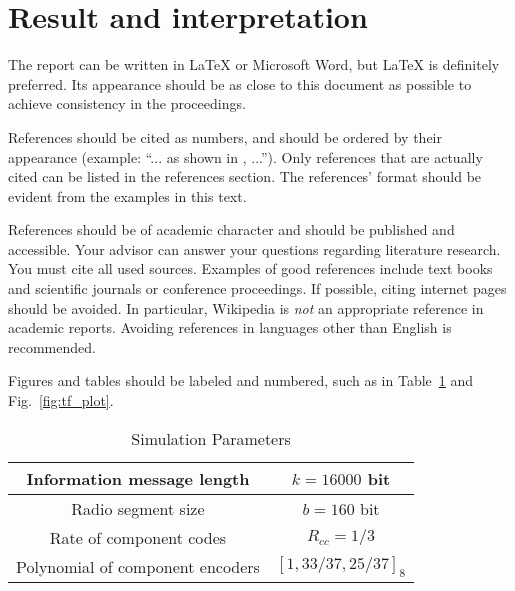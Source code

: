 \documentclass[journal, a4paper]{IEEEtran}
\begin{document}
	\section{Result and interpretation}
	The report can be written in \LaTeX{} or Microsoft Word, but \LaTeX{} is definitely preferred.
	Its appearance should be as close to this document as possible to achieve consistency in the proceedings.
	
	References should be cited as numbers, and should be ordered by their appearance (example: ``... as shown in \cite{HOP96}, ...'').
	Only references that are actually cited can be listed in the references section.
	The references' format should be evident from the examples in this text.
	
	References should be of academic character and should be published and accessible.
	Your advisor can answer your questions regarding literature research.
	You must cite all used sources.
	Examples of good references include text books and scientific journals or conference proceedings.
	If possible, citing internet pages should be avoided. In particular, Wikipedia is \emph{not} an appropriate reference in academic reports.
	Avoiding references in languages other than English is recommended.
	
	Figures and tables should be labeled and numbered, such as in Table~\ref{tab:simParameters} and Fig.~\ref{fig:tf_plot}.
	
	\begin{table}[!hbt]
		\begin{center}
			\caption{Simulation Parameters}
			\label{tab:simParameters}
			\begin{tabular}{|c|c|}
				\hline
				Information message length & $k=16000$ bit \\
				\hline
				Radio segment size & $b=160$ bit \\
				\hline
				Rate of component codes & $R_{cc}=1/3$\\
				\hline
				Polynomial of component encoders & $[1 , 33/37 , 25/37]_8$\\
				\hline
			\end{tabular}
		\end{center}
	\end{table}
	
\end{document}
